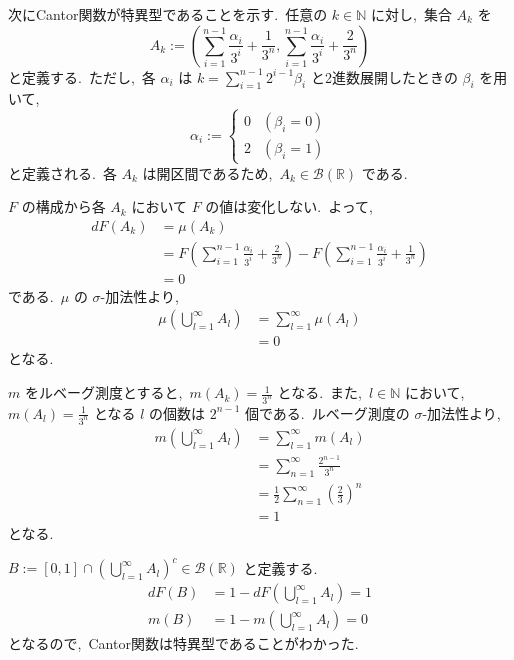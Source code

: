 \documentclass[a4j,11pt]{jarticle}
\theoremstyle{definition}
\begin{document}
次にCantor関数が特異型であることを示す.\ 
任意の
$k \in \mathbb{N}$
に対し,\ 集合
$A_k$
を
\begin{equation}
  A_k :=\left( \sum_{i=1}^{n-1}\frac{\alpha_i}{3^i} + \frac{1}{3^n}, \sum_{i=1}^{n-1}\frac{\alpha_i}{3^i} + \frac{2}{3^n}\right)
\end{equation}
と定義する.\ 
ただし,\ 各
$\alpha_i$
は
$k = \sum_{i=1}^{n-1} 2^{i-1}\beta_i$
と2進数展開したときの
$\beta_i$
を用いて,\ 
\begin{equation}
  \alpha_i := 
  \begin{cases}
    0 & (\beta_i = 0) \\
    2 & (\beta_i = 1)
  \end{cases}
\end{equation}
と定義される.\ 
各
$A_k$
は開区間であるため,\ 
$A_k \in \mathcal{B}(\mathbb{R})$
である.\ 

$F$
の構成から各
$A_k$
において
$F$
の値は変化しない.\ 
よって,\ 
\begin{align}
  dF(A_k)
  & = \mu(A_k) \\
  & = F\left( \sum_{i=1}^{n-1}\frac{\alpha_i}{3^i} + \frac{2}{3^n}\right) - F\left( \sum_{i=1}^{n-1}\frac{\alpha_i}{3^i} + \frac{1}{3^n}\right) \\
  & = 0
\end{align}
である.\ 
$\mu$
の
$\sigma$-加法性より,\ 
\begin{align}
  \mu\left( \bigcup_{l=1}^{\infty} A_l\right)
  & = \sum_{l=1}^{\infty} \mu(A_l) \\
  & = 0
\end{align}
となる.\ 

$m$
をルベーグ測度とすると,\ 
$m(A_k) = \frac{1}{3^n}$
となる.\ 
また,\ 
$l \in \mathbb{N}$
において,\ 
$m(A_l) = \frac{1}{3^n}$
となる
$l$
の個数は
$2^{n-1}$
個である.\ 
ルベーグ測度の
$\sigma$-加法性より,\ 
\begin{align}
  m\left( \bigcup_{l=1}^{\infty} A_l\right)
  & = \sum_{l=1}^{\infty} m(A_l) \\
  & = \sum_{n=1}^{\infty} \frac{2^{n-1}}{3^n} \\
  & = \frac{1}{2} \sum_{n=1}^{\infty} \left( \frac{2}{3}\right)^n \\
  & = 1
\end{align}
となる.\ 

$B := [0,1] \cap \left( \bigcup_{l=1}^{\infty}A_l\right)^c \in \mathcal{B}(\mathbb{R})$
と定義する.\ 
\begin{align}
  dF(B) & = 1 - dF\left( \bigcup_{l=1}^{\infty}A_l\right) = 1 \\
  m(B) & = 1 - m\left( \bigcup_{l=1}^{\infty}A_l\right) = 0
\end{align}
となるので,\ Cantor関数は特異型であることがわかった.\ 
\end{document}
